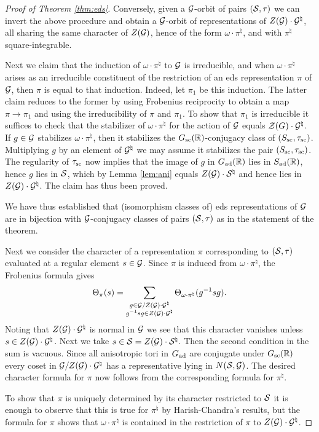 \documentclass{article}
\theoremstyle{definition}
\numberwithin{equation}{section}
\renewcommand{\-}{\hyp{}}
\begin{document}
\begin{proof}[Proof of Theorem \ref{thm:eds}]
	Conversely, given a $\mathcal{G}$-orbit of pairs $(\mathcal{S},\tau)$ we can invert the above procedure and obtain a $\mathcal{G}$-orbit of representations of $Z(\mathcal{G}) \cdot \mathcal{G}^\natural$, all sharing the same character of $Z(\mathcal{G})$, hence of the form $\omega \cdot \pi^\natural$, and with $\pi^\natural$ square-integrable.

	Next we claim that the induction of $\omega\cdot\pi^\natural$ to $\mathcal{G}$ is irreducible, and when $\omega\cdot\pi^\natural$ arises as an irreducible constituent of the restriction of an eds representation $\pi$ of $\mathcal{G}$, then $\pi$ is equal to that induction. Indeed, let $\pi_1$ be this induction. The latter claim reduces to the former by using Frobenius reciprocity to obtain a map $\pi \to \pi_1$ and using the irreducibility of $\pi$ and $\pi_1$. To show that $\pi_1$ is irreducible it suffices to check that the stabilizer of $\omega\cdot\pi^\natural$ for the action of $\mathcal{G}$ equals $\mathcal{Z}(G) \cdot \mathcal{G}^\natural$. If $g \in \mathcal{G}$ stabilizes $\omega\cdot\pi^\natural$, then it stabilizes the $G_{\textrm{sc}}(\mathbb{R})$-conjugacy class of $(S_{\textrm{sc}},\tau_{\textrm{sc}})$. Multiplying $g$ by an element of $\mathcal{G}^\natural$ we may assume it stabilizes the pair $(S_{\textrm{sc}},\tau_{\textrm{sc}})$. The regularity of $\tau_{\textrm{sc}}$ now implies that the image of $g$ in $G_{\textrm{ad}}(\mathbb{R})$ lies in $S_{\textrm{ad}}(\mathbb{R})$, hence $g$ lies in $\mathcal{S}$, which by Lemma \ref{lem:ani} equals $Z(\mathcal{G})\cdot \mathcal{S}^\natural$ and hence lies in $Z(\mathcal{G})\cdot \mathcal{G}^\natural$. The claim has thus been proved.

	We have thus established that (isomorphism classes of) eds representations of $\mathcal{G}$ are in bijection with $\mathcal{G}$-conjugacy classes of pairs $(\mathcal{S},\tau)$ as in the statement of the theorem.

	Next we consider the character of a representation $\pi$ corresponding to $(\mathcal{S},\tau)$ evaluated at a regular element $s \in \mathcal{G}$. Since $\pi$ is induced from $\omega\cdot\pi^\natural$, the Frobenius formula gives
	\[ \Theta_\pi(s) = \sum_{\substack{g \in \mathcal{G}/Z(\mathcal{G})\cdot \mathcal{G}^\natural\\ g^{-1}sg \in Z(\mathcal{G})\cdot \mathcal{G}^\natural}} \Theta_{\omega\cdot\pi^\natural}(g^{-1}sg).\]
	Noting that $Z(\mathcal{G}) \cdot \mathcal{G}^\natural$ is normal in $\mathcal{G}$ we see that this character vanishes unless $s \in Z(\mathcal{G}) \cdot \mathcal{G}^\natural$. Next we take $s \in \mathcal{S} = Z(\mathcal{G}) \cdot \mathcal{S}^\natural$. Then the second condition in the sum is vacuous. Since all anisotropic tori in $G_{\textrm{ad}}$ are conjugate under $G_{\textrm{sc}}(\mathbb{R})$ every coset in $\mathcal{G}/Z(\mathcal{G})\cdot \mathcal{G}^\natural$ has a representative lying in $N(\mathcal{S},\mathcal{G})$. The desired character formula for $\pi$ now follows from the corresponding formula for $\pi^\natural$.

	To show that $\pi$ is uniquely determined by its character restricted to $\mathcal{S}$ it is enough to observe that this is true for $\pi^\natural$ by Harish-Chandra's results, but the formula for $\pi$ shows that $\omega \cdot \pi^\natural$ is contained in the restriction of $\pi$ to $Z(\mathcal{G}) \cdot \mathcal{G}^\natural$.	
\end{proof}
\end{document}
